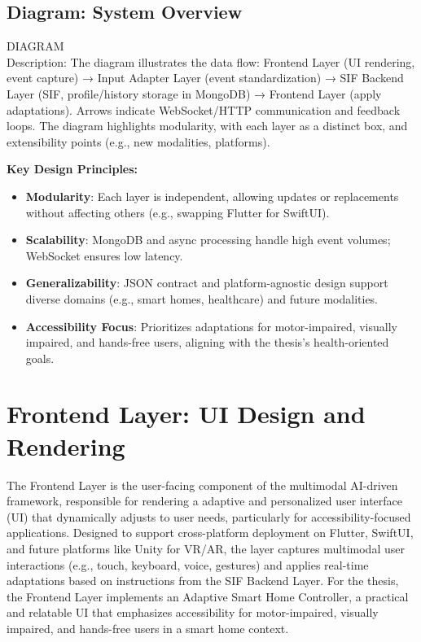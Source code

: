 \documentclass[openany]{book}
\begin{document}
    \subsection{Diagram: System Overview}
    DIAGRAM \\
    Description: The diagram illustrates the data flow: Frontend Layer (UI rendering, event capture) → Input Adapter Layer (event standardization) → SIF Backend Layer (SIF, profile/history storage in MongoDB) → Frontend Layer (apply adaptations). Arrows indicate WebSocket/HTTP communication and feedback loops. The diagram highlights modularity, with each layer as a distinct box, and extensibility points (e.g., new modalities, platforms).

    \textbf{Key Design Principles:}
    \begin{itemize}
        \item \textbf{Modularity}: Each layer is independent, allowing updates or replacements without affecting others (e.g., swapping Flutter for SwiftUI).
        \item \textbf{Scalability}: MongoDB and async processing handle high event volumes; WebSocket ensures low latency.
        \item \textbf{Generalizability}: JSON contract and platform-agnostic design support diverse domains (e.g., smart homes, healthcare) and future 
        modalities.
        \item \textbf{Accessibility Focus}: Prioritizes adaptations for motor-impaired, visually impaired, and hands-free users, aligning with the thesis’s health-oriented goals.
    \end{itemize}

\section{Frontend Layer: UI Design and Rendering}
The Frontend Layer is the user-facing component of the multimodal AI-driven framework, responsible for rendering a adaptive and personalized user interface (UI) that dynamically adjusts to user needs, particularly for accessibility-focused applications. Designed to support cross-platform deployment on Flutter, SwiftUI, and future platforms like Unity for VR/AR, the layer captures multimodal user interactions (e.g., touch, keyboard, voice, gestures) and applies real-time adaptations based on instructions from the SIF Backend Layer. For the thesis, the Frontend Layer implements an Adaptive Smart Home Controller, a practical and relatable UI that emphasizes accessibility for motor-impaired, visually impaired, and hands-free users in a smart home context.
\end{document}
